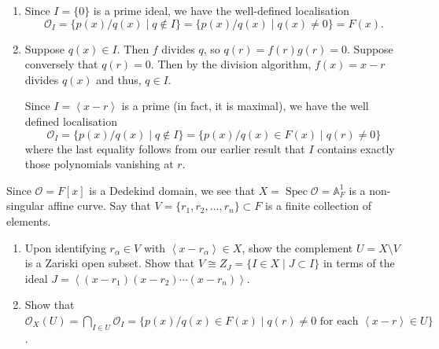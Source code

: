 \documentclass[12 pt, letterpaper]{hmcpset}
\begin{document}
\begin{solution}
	\begin{enumerate}
		\item Since $I = \{ 0 \}$ is a prime ideal, we have the well-defined localisation
			\[
				\mathcal{O}_{I} = \{ p(x) / q(x) \mid q \notin I \} = \{ p(x) / q(x) \mid q(x) \neq 0 \} = F(x).
			\]
		\item Suppose $q(x) \in I$. Then $f$ divides $q$, so $q(r) = f(r) g(r) = 0$. Suppose conversely that $q(r) = 0$. Then by the division algorithm, $f(x) = x - r$  divides $q(x)$ and thus, $q \in I$.

			Since $I = \left < x - r \right >$ is a prime (in fact, it is maximal), we have the well defined localisation
			\[
				\mathcal{O}_{I} = \{ p(x) / q(x) \mid q \notin I \} = \{ p(x) / q(x) \in F(x) \mid q(r) \neq 0 \}
			\]
			where the last equality follows from our earlier result that $I$ contains exactly those polynomials vanishing at $r$.
	\end{enumerate}
\end{solution}

\pagebreak

\begin{problem}[Problem 5.]
	Since $\mathcal{O} = F[x]$ is a Dedekind domain, we see that $X = \operatorname{Spec} \mathcal{O} = \mathbb{A}^{1}_{F}$ is a non-singular affine curve. Say that $V = \{ r_{1}, r_{2}, \dots, r_{n} \} \subset F$ is a finite collection of elements.
	\begin{enumerate}
		\item Upon identifying $r_{\alpha} \in V$ with $\left < x - r_{\alpha} \right > \in X$, show the complement $U = X \setminus V$ is a Zariski open subset. Show that $V \cong Z_{J} = \{ I \in X \mid J \subset I \}$ in terms of the ideal $J = \left < (x - r_{1}) (x - r_{2}) \dotsm (x - r_{n}) \right >$.
		\item Show that $\mathcal{O}_{X}(U) = \bigcap_{I \in U} \mathcal{O}_{I} = \{ p(x) / q(x) \in F(x) \mid q(r) \neq 0 \text{ for each } \left < x - r \right > \in U \}$.
	\end{enumerate}
\end{problem}
\end{document}
